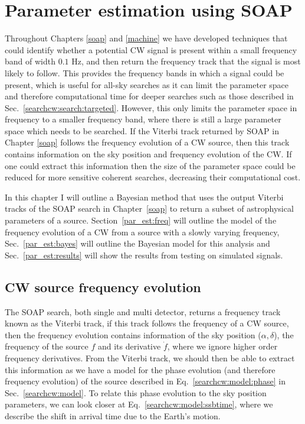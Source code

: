 \chapter{\label{par_est}Parameter estimation using SOAP}

Throughout Chapters \ref{soap} and \ref{machine} we have developed
techniques that could identify whether a potential \gls{CW}
signal is present within a small frequency band of width $0.1$ Hz, and then
return the frequency track that the signal is most likely to follow.  This
provides the frequency bands in which a signal could be present, which is useful
for all-sky searches as it can limit the parameter space and therefore
computational time for deeper searches such as those described in
Sec.~\ref{searchcw:search:targeted}.  However, this only limits the parameter
space in frequency to a smaller frequency band, where there is still a large
parameter space which needs to be searched.  If the Viterbi track returned by
SOAP in Chapter \ref{soap} follows the frequency evolution of a \gls{CW}
source, then this track contains information on the sky position and frequency
evolution of the \gls{CW}.  If one could extract this information then the size
of the parameter space could be reduced for more sensitive coherent searches, decreasing their computational cost.

In this chapter I will outline a Bayesian method that uses the output Viterbi tracks of the SOAP search in Chapter~\ref{soap} to return a subset of astrophysical parameters of a
source.  Section~\ref{par_est:freq} will outline the model of the frequency
evolution of a \gls{CW} from a source with a slowly varying frequency,
Sec.~\ref{par_est:bayes} will outline the Bayesian model for this analysis and
Sec.~\ref{par_est:results} will show the results from testing on simulated
signals.

\section{\label{par_est:freq}\gls{CW} source frequency evolution}

The SOAP search, both single and multi detector, returns a frequency track known as the Viterbi track, if this
track follows the frequency of a \gls{CW} source, then the frequency evolution
contains information of the sky position ($\alpha, \delta$), the frequency of
the source $f$ and its derivative $\dot{f}$, where we ignore higher order
frequency derivatives.  From the Viterbi track, we should then be able to
extract this information as we have a model for the phase evolution (and
therefore frequency evolution) of the source described in
Eq.~\ref{searchcw:model:phase} in Sec.~\ref{searchcw:model}.  To relate this
phase evolution to the sky position parameters, we can look closer at
Eq.~\ref{searchcw:model:ssbtime}, where we describe the shift in arrival time
due to the Earth's motion.

